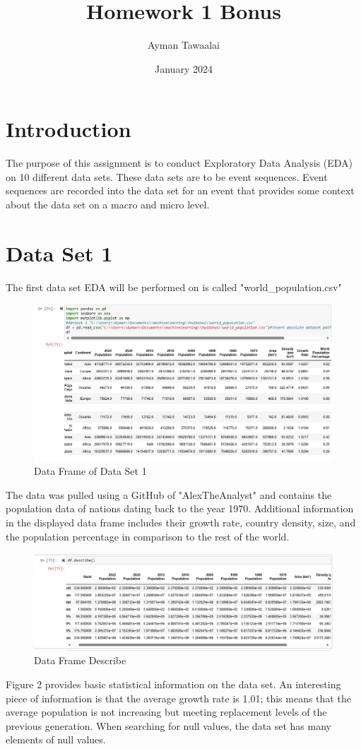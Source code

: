 \documentclass{article}
\title{Homework 1 Bonus}
\author{Ayman Tawaalai}
\date{January 2024}
\begin{document}
\maketitle

\section{Introduction}
The purpose of this assignment is to conduct Exploratory Data Analysis (EDA) on 10 different data sets. These data sets are to be event sequences. Event sequences are recorded into the data set for an event that provides some context about the data set on a macro and micro level.
\section{Data Set 1}
The first data set EDA will be performed on is called "world\_population.csv" 
\begin{figure}
    \centering
    \includegraphics[width=0.5\linewidth]{image1.png}
    \caption{Data Frame of Data Set 1}
    \label{fig:enter-label}
\end{figure}
The data was pulled using a GitHub of "AlexTheAnalyst" and contains the population data of nations dating back to the year 1970. Additional information in the displayed data frame includes their growth rate, country density, size, and the population percentage in comparison to the rest of the world. 
\begin{figure}
    \centering
    \includegraphics[width=0.5\linewidth]{image2.png}
    \caption{Data Frame Describe}
    \label{fig:enter-label}
\end{figure}
Figure 2 provides basic statistical information on the data set. An interesting piece of information is that the average growth rate is 1.01; this means that the average population is not increasing but meeting replacement levels of the previous generation. When searching for null values, the data set has many elements of null values. 
\end{document}
